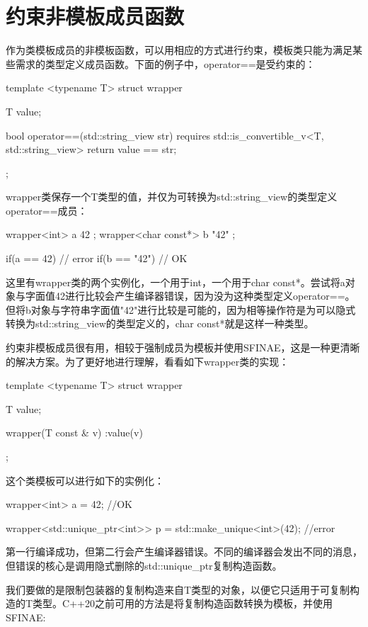 \section{约束非模板成员函数}
作为类模板成员的非模板函数，可以用相应的方式进行约束，模板类只能为满足某些需求的类型定义成员函数。下面的例子中，operator==是受约束的：

\begin{cpp}
template <typename T>
struct wrapper
{
	T value;
	
	bool operator==(std::string_view str)
	requires std::is_convertible_v<T, std::string_view>
	{
		return value == str;
	}
};
\end{cpp}

wrapper类保存一个T类型的值，并仅为可转换为std::string\_view的类型定义operator==成员：

\begin{cpp}
wrapper<int> a{ 42 };
wrapper<char const*> b{ "42" };

if(a == 42) {} // error
if(b == "42") {} // OK
\end{cpp}

这里有wrapper类的两个实例化，一个用于int，一个用于char const*。尝试将a对象与字面值42进行比较会产生编译器错误，因为没为这种类型定义operator==。但将b对象与字符串字面值"42"进行比较是可能的，因为相等操作符是为可以隐式转换为std::string\_view的类型定义的，char const*就是这样一种类型。

约束非模板成员很有用，相较于强制成员为模板并使用SFINAE，这是一种更清晰的解决方案。为了更好地进行理解，看看如下wrapper类的实现：

\begin{cpp}
template <typename T>
struct wrapper
{
	T value;
	
	wrapper(T const & v) :value(v) {}
};
\end{cpp}

这个类模板可以进行如下的实例化：

\begin{cpp}
wrapper<int> a = 42; //OK

wrapper<std::unique_ptr<int>> p =
	std::make_unique<int>(42); //error
\end{cpp}

第一行编译成功，但第二行会产生编译器错误。不同的编译器会发出不同的消息，但错误的核心是调用隐式删除的std::unique\_ptr复制构造函数。

我们要做的是限制包装器的复制构造来自T类型的对象，以便它只适用于可复制构造的T类型。C++20之前可用的方法是将复制构造函数转换为模板，并使用SFINAE:

